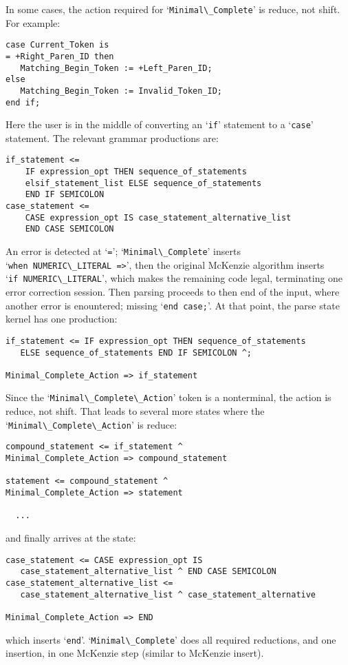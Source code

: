 \documentclass[authordraft]{acmart}
\newcommand{\code}[1]{`\lstinline|#1|'}
\begin{document}
In some cases, the action required for \code{Minimal\_Complete} is
reduce, not shift. For example:
\begin{lstlisting}
case Current_Token is
= +Right_Paren_ID then
   Matching_Begin_Token := +Left_Paren_ID;
else
   Matching_Begin_Token := Invalid_Token_ID;
end if;
\end{lstlisting}
Here the user is in the middle of converting an \code{if} statement to
a \code{case} statement. The relevant grammar productions are:
\begin{verbatim}
if_statement <=
    IF expression_opt THEN sequence_of_statements
    elsif_statement_list ELSE sequence_of_statements
    END IF SEMICOLON
case_statement <=
    CASE expression_opt IS case_statement_alternative_list
    END CASE SEMICOLON
\end{verbatim}
An error is detected at \code{=}; \code{Minimal\_Complete} inserts\\
\code{when NUMERIC\_LITERAL =>}, then the original McKenzie algorithm
inserts \\\code{if NUMERIC\_LITERAL}, which makes the remaining code
legal, terminating one error correction session. Then parsing proceeds
to then end of the input, where another error is enountered; missing
\code{end case;}. At that point, the parse state kernel has one
production:
\begin{verbatim}
if_statement <= IF expression_opt THEN sequence_of_statements
   ELSE sequence_of_statements END IF SEMICOLON ^;

Minimal_Complete_Action => if_statement
\end{verbatim}
Since the \code{Minimal\_Complete\_Action} token is a nonterminal, the action
is reduce, not shift. That leads to several more states where the\\
\code{Minimal\_Complete\_Action} is reduce:
\begin{verbatim}
compound_statement <= if_statement ^
Minimal_Complete_Action => compound_statement

statement <= compound_statement ^
Minimal_Complete_Action => statement

  ...
\end{verbatim}

and finally arrives at the state:
\begin{verbatim}
case_statement <= CASE expression_opt IS
   case_statement_alternative_list ^ END CASE SEMICOLON
case_statement_alternative_list <=
   case_statement_alternative_list ^ case_statement_alternative

Minimal_Complete_Action => END
\end{verbatim}
which inserts \code{end}. \code{Minimal\_Complete} does all required
reductions, and one insertion, in one McKenzie step (similar to
McKenzie insert).
\end{document}

